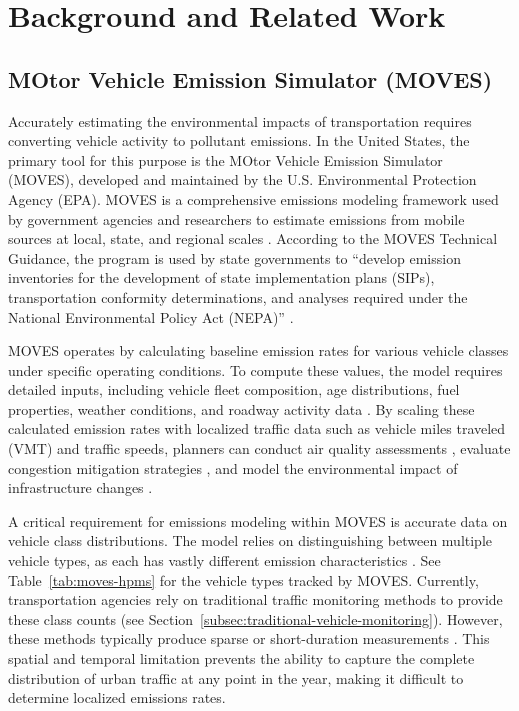\section{Background and Related Work}

\subsection{MOtor Vehicle Emission Simulator (MOVES)}

Accurately estimating the environmental impacts of transportation requires 
converting vehicle activity to pollutant emissions. In the United States, 
the primary tool for this purpose is the MOtor Vehicle Emission Simulator (MOVES),
developed and maintained by the U.S. Environmental Protection Agency (EPA). MOVES
is a comprehensive emissions modeling framework used by government agencies and 
researchers to estimate emissions from mobile sources at local, state, and regional
scales \cite{USEPA_tech_2024, USEPA_overview_2025}. 
According to the MOVES Technical Guidance, the program is used by state governments
to ``develop emission inventories for the development of state implementation 
plans (SIPs), transportation conformity determinations, and analyses required 
under the National Environmental Policy Act (NEPA)'' \cite{USEPA_tech_2024}.

MOVES operates by calculating baseline emission rates for various 
vehicle classes under specific operating conditions. To compute these values,
the model requires detailed inputs, including vehicle fleet composition, age 
distributions, fuel properties, weather conditions, and roadway activity data \cite{USEPA_tech_2024}.
By scaling these calculated emission rates with localized traffic data 
such as vehicle miles traveled (VMT) and traffic speeds, planners can conduct 
air quality assessments \cite{NY911_hill_ghg, california_air_resources_board_brake, octc_final_2021}, 
evaluate congestion mitigation strategies \cite{TAYARANI2020102620}, 
and model the environmental impact of infrastructure changes \cite{ZHANG2013307}.

A critical requirement for emissions modeling within MOVES is accurate data on 
vehicle class distributions. The model relies on distinguishing between multiple 
vehicle types, as each has vastly different emission characteristics 
\cite{USEPA_tech_2024}. 
See Table~\ref{tab:moves-hpms} for the vehicle types tracked by MOVES. 
Currently, transportation agencies rely on traditional traffic monitoring methods 
to provide these class counts (see Section~\ref{subsec:traditional-vehicle-monitoring}). 
However, these methods typically produce sparse or 
short-duration measurements \cite{FHWA_traffic_2010}. 
This spatial and temporal limitation prevents the ability to capture the complete 
distribution of urban traffic at any point in the year, making it difficult to 
determine localized emissions rates.

